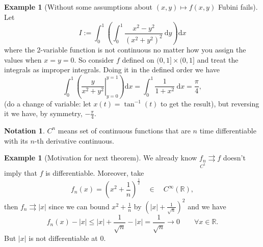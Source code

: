 \documentclass[a4paper]{article}
\theoremstyle{definition}
\newtheorem{example}[defn]{Example}
\newtheorem*{notation}{Notation}
\begin{document}
\begin{example}[Without some assumptions about $(x,y)\mapsto f(x,y)$ Fubini fails]
Let
\[
I:=\int_0^1 \left( \int_0^1 \frac{x^2-y^2}{(x^2+y^2)^2} \ \mathrm d y\right) \mathrm d x
\]
where the 2-variable function is not continuous no matter how you assign the values when $x=y=0$. So consider $f$ defined on $(0,1]\times (0,1]$ and treat the integrals as improper integrals. Doing it in the defined order we have
\[
\int_0^1\left( \left. \frac{y}{x^2+y^2}\right|_{y=0}^{y=1} \right) \mathrm d x=\int_0^1 \frac{1}{1+x^2} \ \mathrm d x = \frac{\pi}{4},
\]
(do a change of variable: let $x(t)=\tan ^{-1}(t)$ to get the result), but reversing it we have, by symmetry, $-\frac{\pi}{4}$.
\end{example}
\begin{notation}
$C^n$ means set of continuous functions that are $n$ time differentiable with its $n$-th derivative continuous.
\end{notation}

\begin{example}[Motivation for next theorem]
We already know $\underset{C^1}{f_n} \rightrightarrows f$ doesn't imply that $f$ is differentiable. Moreover, take
\[
f_n(x)=\left(x^2+\frac{1}{n}\right)^{\frac12} \quad \in \quad C^\infty (\mathbb R),
\]
then $f_n \rightrightarrows |x|$ since we can bound $x^2+\frac{1}{n}$ by $\left(|x|+\frac{1}{\sqrt n} \right)^2$ and we have
\[
f_n(x)-|x|\leq |x|+\frac{1}{\sqrt n}-|x|=\frac{1}{\sqrt n}\rightarrow 0 \qquad \forall x\in \mathbb R .
\]
But $|x|$ is not differentiable at 0.
\begin{center}
\end{center}
\end{example}
\end{document}

